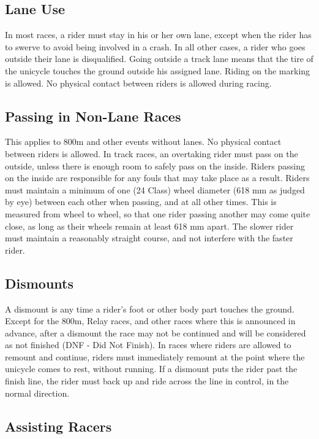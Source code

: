 \subsection{Lane Use}

In most races, a rider must stay in his or her own lane, except when the rider has to swerve to avoid being involved in a crash.
In all other cases, a rider who goes outside their lane is disqualified.
Going outside a track lane means that the tire of the unicycle touches the ground outside his assigned lane.
Riding on the marking is allowed.
No physical contact between riders is allowed during racing.

\subsection{Passing in Non-Lane Races \label{subsec:track-field_lane-use_non-lane-races}}

This applies to 800m and other events without lanes.
No physical contact between riders is allowed.
In track races, an overtaking rider must pass on the outside, unless there is enough room to safely pass on the inside.
Riders passing on the inside are responsible for any fouls that may take place as a result.
Riders must maintain a minimum of one (24 Class) wheel diameter (618 mm as judged by eye) between each other when passing, and at all other times.
This is measured from wheel to wheel, so that one rider passing another may come quite close, as long as their wheels remain at least 618 mm apart.
The slower rider must maintain a reasonably straight course, and not interfere with the faster rider.

\subsection{Dismounts}

A dismount is any time a rider's foot or other body part touches the ground.
Except for the 800m, Relay races, and other races where this is announced in advance, after a dismount the race may not be continued and will be considered as not finished (DNF - Did Not Finish).
In races where riders are allowed to remount and continue, riders must immediately remount at the point where the unicycle comes to rest, without running.
If a dismount puts the rider past the finish line, the rider must back up and ride across the line in control, in the normal direction.

\subsection{Assisting Racers}

